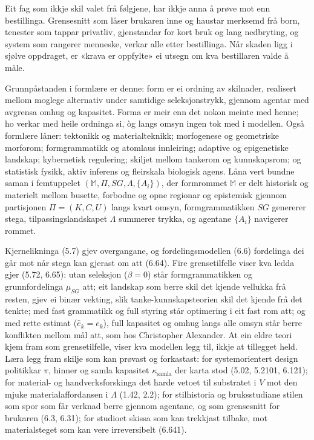 Eit fag som ikkje skil valet frå følgjene, har ikkje anna å prøve mot enn bestillinga. Grensesnitt som låser brukaren inne og haustar merksemd frå born, tenester som tappar privatliv, gjenstandar for kort bruk og lang nedbryting, og system som rangerer menneske, verkar alle etter bestillinga. Når skaden ligg i sjølve oppdraget, er «krava er oppfylte» ei utsegn om kva bestillaren valde å måle.

Grunnpåstanden i formlære er denne: form er ei ordning av skilnader, realisert mellom moglege alternativ under samtidige seleksjonstrykk, gjennom agentar med avgrensa omhug og kapasitet. Forma er meir enn det nokon meinte med henne; ho verkar med heile ordninga si, òg langs omsyn ingen tok med i modellen. Også formlære låner: tektonikk og materialteknikk; morfogenese og geometriske morforom; formgrammatikk og atomlaus innleiring; adaptive og epigenetiske landskap; kybernetisk regulering; skiljet mellom tankerom og kunnskapsrom; og statistisk fysikk, aktiv inferens og fleirskala biologisk agens. Låna vert bundne saman i femtuppelet \((\mathbb{M},\Pi,SG,\Lambda,\{A_i\})\), der formrommet \(\mathbb{M}\) er delt historisk og materielt mellom busette, forbodne og opne regionar og epistemisk gjennom partisjonen \(\Pi=(K,C,U)\) langs kvart omsyn, formgrammatikken \(SG\) genererer stega, tilpassingslandskapet \(\Lambda\) summerer trykka, og agentane \(\{A_i\}\) navigerer rommet.

Kjernelikninga (5.7) gjev overgangane, og fordelingsmodellen (6.6) fordelinga dei går mot når stega kan gjerast om att (6.64). Fire grensetilfelle viser kva ledda gjer (5.72, 6.65): utan seleksjon (\(\beta=0\)) står formgrammatikken og grunnfordelinga \(\mu_{SG}\) att; eit landskap som berre skil det kjende vellukka frå resten, gjev ei binær vekting, slik tanke-kunnskapsteorien skil det kjende frå det tenkte; med fast grammatikk og full styring står optimering i eit fast rom att; og med rette estimat (\(\hat{e}_k=e_k\)), full kapasitet og omhug langs alle omsyn står berre konflikten mellom mål att, som hos Christopher Alexander. At ein eldre teori kjem fram som grensetilfelle, viser kva modellen legg til, ikkje at tillegget held. Læra legg fram skilje som kan prøvast og forkastast: for systemorientert design politikkar \(\pi\), hinner og samla kapasitet \(\kappa_{\text{samla}}\) der karta stod (5.02, 5.2101, 6.121); for material- og handverksforskinga det harde vetoet til substratet i \(V\) mot den mjuke materialaffordansen i \(\Lambda\) (1.42, 2.2); for stilhistoria og bruksstudiane stilen som spor som får verknad berre gjennom agentane, og som grensesnitt for brukaren (6.3, 6.31); for studioet skissa som kan trekkjast tilbake, mot materialsteget som kan vere irreversibelt (6.641).

